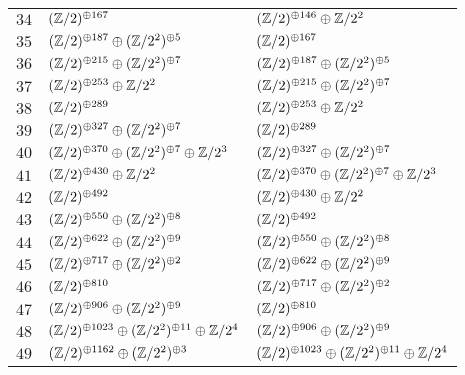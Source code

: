 \begin{supertabular}{|c|p{5.5cm}|p{5.5cm}|}
$34$%
&$(\mathbb{Z}/2)^{\oplus167}$%
&$(\mathbb{Z}/2)^{\oplus146}\oplus\mathbb{Z}/2^{2}$\\

$35$%
&$(\mathbb{Z}/2)^{\oplus187}\oplus(\mathbb{Z}/2^{2})^{\oplus5}$%
&$(\mathbb{Z}/2)^{\oplus167}$\\

$36$%
&$(\mathbb{Z}/2)^{\oplus215}\oplus(\mathbb{Z}/2^{2})^{\oplus7}$%
&$(\mathbb{Z}/2)^{\oplus187}\oplus(\mathbb{Z}/2^{2})^{\oplus5}$\\

$37$%
&$(\mathbb{Z}/2)^{\oplus253}\oplus\mathbb{Z}/2^{2}$%
&$(\mathbb{Z}/2)^{\oplus215}\oplus(\mathbb{Z}/2^{2})^{\oplus7}$\\

$38$%
&$(\mathbb{Z}/2)^{\oplus289}$%
&$(\mathbb{Z}/2)^{\oplus253}\oplus\mathbb{Z}/2^{2}$\\

$39$%
&$(\mathbb{Z}/2)^{\oplus327}\oplus(\mathbb{Z}/2^{2})^{\oplus7}$%
&$(\mathbb{Z}/2)^{\oplus289}$\\

$40$%
&$(\mathbb{Z}/2)^{\oplus370}\oplus(\mathbb{Z}/2^{2})^{\oplus7}\oplus\mathbb{Z}/2^{3}$%
&$(\mathbb{Z}/2)^{\oplus327}\oplus(\mathbb{Z}/2^{2})^{\oplus7}$\\

$41$%
&$(\mathbb{Z}/2)^{\oplus430}\oplus\mathbb{Z}/2^{2}$%
&$(\mathbb{Z}/2)^{\oplus370}\oplus(\mathbb{Z}/2^{2})^{\oplus7}\oplus\mathbb{Z}/2^{3}$\\

$42$%
&$(\mathbb{Z}/2)^{\oplus492}$%
&$(\mathbb{Z}/2)^{\oplus430}\oplus\mathbb{Z}/2^{2}$\\

$43$%
&$(\mathbb{Z}/2)^{\oplus550}\oplus(\mathbb{Z}/2^{2})^{\oplus8}$%
&$(\mathbb{Z}/2)^{\oplus492}$\\

$44$%
&$(\mathbb{Z}/2)^{\oplus622}\oplus(\mathbb{Z}/2^{2})^{\oplus9}$%
&$(\mathbb{Z}/2)^{\oplus550}\oplus(\mathbb{Z}/2^{2})^{\oplus8}$\\

$45$%
&$(\mathbb{Z}/2)^{\oplus717}\oplus(\mathbb{Z}/2^{2})^{\oplus2}$%
&$(\mathbb{Z}/2)^{\oplus622}\oplus(\mathbb{Z}/2^{2})^{\oplus9}$\\

$46$%
&$(\mathbb{Z}/2)^{\oplus810}$%
&$(\mathbb{Z}/2)^{\oplus717}\oplus(\mathbb{Z}/2^{2})^{\oplus2}$\\

$47$%
&$(\mathbb{Z}/2)^{\oplus906}\oplus(\mathbb{Z}/2^{2})^{\oplus9}$%
&$(\mathbb{Z}/2)^{\oplus810}$\\

$48$%
&$(\mathbb{Z}/2)^{\oplus1023}\oplus(\mathbb{Z}/2^{2})^{\oplus11}\oplus\mathbb{Z}/2^{4}$%
&$(\mathbb{Z}/2)^{\oplus906}\oplus(\mathbb{Z}/2^{2})^{\oplus9}$\\

$49$%
&$(\mathbb{Z}/2)^{\oplus1162}\oplus(\mathbb{Z}/2^{2})^{\oplus3}$%
&$(\mathbb{Z}/2)^{\oplus1023}\oplus(\mathbb{Z}/2^{2})^{\oplus11}\oplus\mathbb{Z}/2^{4}$\\


\end{supertabular}
